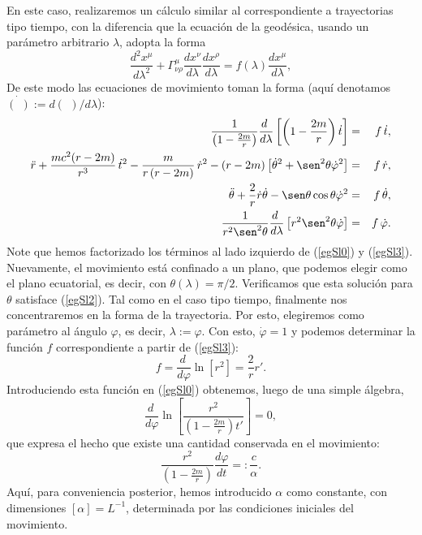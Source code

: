 En este caso, realizaremos un cálculo similar al correspondiente a trayectorias tipo tiempo, con la diferencia que la ecuación de la geodésica, usando un parámetro arbitrario $\lambda$, adopta la forma
\begin{equation}
\frac{d^2x^\mu}{d\lambda^2}+\Gamma^\mu_{\nu\rho}\frac{dx^\nu}{d\lambda}\frac{dx^\rho}{d\lambda}=f(\lambda)\frac{dx^\mu}{d\lambda},
\end{equation}
De este modo las ecuaciones de movimiento toman la forma (aquí denotamos $\dot{(\ \,)}:={d(\ \,)}/{d\lambda}$):
\begin{eqnarray}
\frac{1}{\left(1-\frac{2m}{r}\right)}\frac{d\ }{d\lambda}\left[\left(1-\frac{2m}{r}\right)\dot{t}\right]&=&f\,\dot{t}, \label{egSl0}\\
\ddot{r}+\frac{mc^2(r-2m)}{r^3}\,\dot{t}^2-\frac{m}{r\left(
r-2m\right) }\,\dot{r}^2-(r-2m) \left[ \dot{\theta}^2+\sen
^2\theta \dot{\varphi}^2\right] &=&f\,\dot{r}, \label{egSl1}\\
\ddot{\theta}+\frac{2}{r}\dot{r}\dot{\theta}-\sen \theta \cos \theta
\dot{\varphi}^2 &=&f\,\dot{\theta}, \label{egSl2}\\
\frac{1}{r^2\sen^2\theta}\frac{d\ }{d\lambda}\left[r^2\sen^2\theta\dot{\varphi}\right] &=&f\,\dot{\varphi}.\label{egSl3}
\end{eqnarray}%
Note que hemos factorizado los términos al lado izquierdo de (\ref{egSl0}) y (\ref{egSl3}). Nuevamente, el movimiento está confinado a un plano, que podemos elegir como el plano ecuatorial, es decir, con $\theta(\lambda)=\pi/2$. Verificamos que esta solución para $\theta$ satisface (\ref{egSl2}). Tal como en el caso tipo tiempo, finalmente nos concentraremos en la forma de la trayectoria. Por esto, elegiremos como parámetro al ángulo $\varphi$, es decir, $\lambda:=\varphi$. Con esto, $\dot{\varphi}=1$ y podemos determinar la función $f$ correspondiente a partir de (\ref{egSl3}):
\begin{equation}
f=\frac{d\ }{d\varphi}\ln\left[r^2\right]=\frac{2}{r}r'.
\end{equation}
Introduciendo esta función en (\ref{egSl0}) obtenemos, luego de una simple álgebra,
\begin{equation}
\frac{d\ }{d\varphi}\ln\left[\frac{r^2}{\left(1-\frac{2m}{r}\right)t'}\right]=0,
\end{equation}
que expresa el hecho que existe una cantidad conservada en el movimiento:
\begin{equation}\label{ccl}
 \frac{r^2}{\left(1-\frac{2m}{r}\right)}\frac{d\varphi}{dt}=:\frac{c}{\alpha}.
\end{equation}
Aquí, para conveniencia posterior, hemos introducido $\alpha$ como constante, con dimensiones $[\alpha]=L^{-1}$, determinada por las condiciones iniciales del movimiento.

